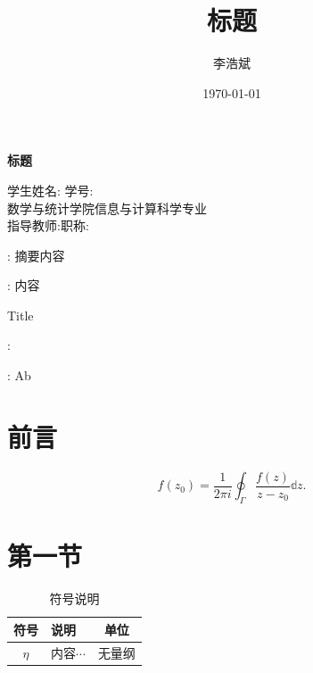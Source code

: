 \documentclass[UTF8,heading=true,12pt,font=songti]{article}
\title{\songti \zihao{3}\bfseries 标题}
\author{李浩斌}
\date{\today}
\begin{document}
    
    \newpage
    \tableofcontents%
    \setcounter{page}{0}%
    \thispagestyle{empty}%
    \newpage
    \begin{center}
    \songti {}\bfseries 标题
	\end{center}
	
	\begin{center}
    \songti {} 学生姓名: \qquad 学号: \\ 
    	\songti {} 数学与统计学院\qquad 信息与计算科学专业\\
    	\songti {} 指导教师:\qquad 职称:
    \end{center}
    : \quad\kaishu{} 摘要内容


    :\quad\kaishu{} 内容
    
    \begin{center}
    	 Title
    \end{center}
    :\quad{} \lipsum[1]
    
    :\quad{} Ab
    
    \section{前言}
	$$
    f(z_0)=\frac{1}{2\pi i}\oint_{\Gamma}\frac{f(z)}{z-z_0}\mathbb{d}z.
    $$

    \section{第一节}
    \lipsum[3]
    \begin{table}[H]
        \centering
        \caption{符号说明}
        \begin{tabular}{clc} %
            \hline
            \textbf{符号} & \textbf{说明} & \textbf{单位} \\ \hline
            $\eta$ & 内容$\cdots$ & 无量纲\\	
            \hline
        \end{tabular}
    \end{table}
\end{document}

